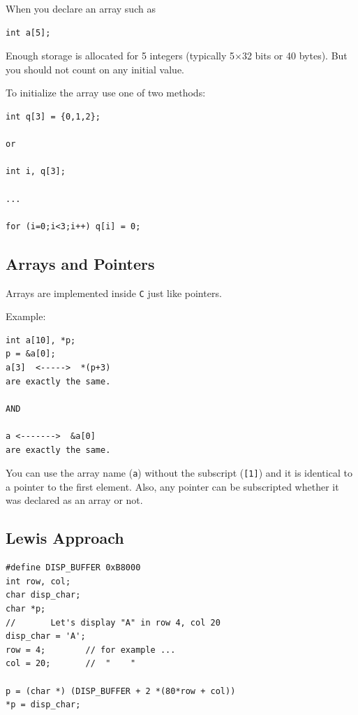 When you declare an array such as
\begin{verbatim}
int a[5];
\end{verbatim}
Enough storage is allocated for 5 integers (typically 5$\times$32 bits
or 40 bytes). But you should not count on any initial value.

To initialize the array use one of two methods:
\begin{verbatim}
int q[3] = {0,1,2};

or

int i, q[3];

...

for (i=0;i<3;i++) q[i] = 0;
\end{verbatim}


\subsection{Arrays and Pointers}
Arrays are implemented inside {\tt C} just like pointers.

Example:
\begin{verbatim}
int a[10], *p;
p = &a[0];
a[3]  <----->  *(p+3)
are exactly the same.

AND

a <------->  &a[0]
are exactly the same.
\end{verbatim}
You can use the array name ({\tt a}) without the subscript
({\tt [1]}) and it is identical to a pointer to the first element.
Also, any pointer can be
subscripted whether it was declared as an array or not.


\subsection*{Lewis Approach}

\begin{verbatim}
#define DISP_BUFFER 0xB8000
int row, col;
char disp_char;
char *p;
//       Let's display "A" in row 4, col 20
disp_char = 'A';
row = 4;        // for example ...
col = 20;       //  "    "

p = (char *) (DISP_BUFFER + 2 *(80*row + col))
*p = disp_char;
\end{verbatim}



